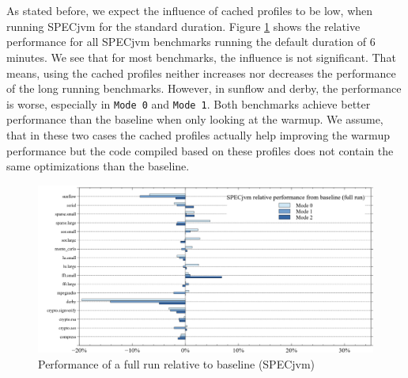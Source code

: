 \\\\
As stated before, we expect the influence of cached profiles to be low, when running SPECjvm for the standard duration. Figure \ref{f:all_full_variation} shows the relative performance for all SPECjvm benchmarks running the default duration of 6 minutes.
We see that for most benchmarks, the influence is not significant. That means, using the cached profiles neither increases nor decreases the performance of the long running benchmarks.
However, in sunflow and derby, the performance is worse, especially in \texttt{Mode 0} and \texttt{Mode 1}. Both benchmarks achieve better performance than the baseline when only looking at the warmup. We assume, that in these two cases the cached profiles actually help improving the warmup performance but the code compiled based on these profiles does not contain the same optimizations than the baseline.
\begin{figure}[ht]
  \begin{center}
    \centering
    \includegraphics[width=1.0\textwidth]{figures/all_full_variation.png}
    \caption{Performance of a full run relative to baseline (SPECjvm)}
    \label{f:all_full_variation}
  \end{center}
\end{figure} 
